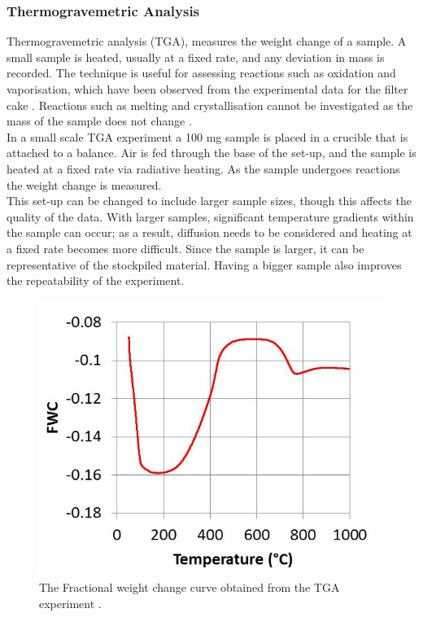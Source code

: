 \subsubsection{Thermogravemetric Analysis}
Thermogravemetric analysis (TGA), measures the weight change of a sample. A small sample is heated, usually at a fixed rate, and any deviation in mass is recorded. The technique is useful for assessing reactions such as oxidation and vaporisation, which have been observed from the experimental data for the filter cake \cite{Ray19}. Reactions such as melting and crystallisation cannot be investigated as the mass of the sample does not change \cite{thermal}.\\

In a small scale TGA experiment a 100 mg sample is placed in a crucible that is attached to a balance. Air is fed through the base of the set-up, and the sample is heated at a fixed rate via radiative heating. As the sample undergoes reactions the weight change is measured.\\

This set-up can be changed to include larger sample sizes, though this affects the quality of the data. With larger samples, significant temperature gradients within the sample can occur; as a result, diffusion needs to be considered and heating at a fixed rate becomes more difficult. Since the sample is larger, it can be representative of the stockpiled material. Having a bigger sample also improves the repeatability of the experiment.\\
\begin{figure}[h!]
\centering
\includegraphics[scale=1]{figures/TGA_exp.jpg}
\caption{The Fractional weight change curve obtained from the TGA experiment \cite{Ray19}.}
\label{TGA_exp}
\end{figure} 
